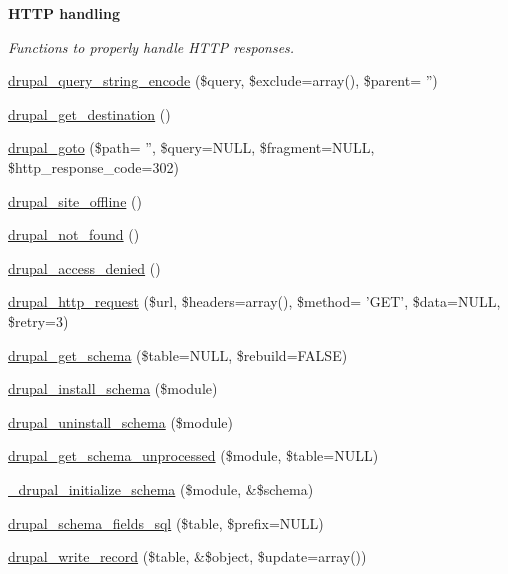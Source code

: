 \begin{Indent}{\bf HTTP handling}\par
{\em Functions to properly handle HTTP responses. }\begin{CompactItemize}
\item 
\hyperlink{common_8inc_1bd761730fc16bd2122dff2790c2842f}{drupal\_\-query\_\-string\_\-encode} (\$query, \$exclude=array(), \$parent= '')
\item 
\hyperlink{common_8inc_0c95c16e75ac4df882686daccc1f8ac5}{drupal\_\-get\_\-destination} ()
\item 
\hyperlink{common_8inc_74b81f841dbbac5a119a9cc7e3ffc614}{drupal\_\-goto} (\$path= '', \$query=NULL, \$fragment=NULL, \$http\_\-response\_\-code=302)
\item 
\hyperlink{common_8inc_fc3a1915f45be2ac8666778eef0e9758}{drupal\_\-site\_\-offline} ()
\item 
\hyperlink{common_8inc_52b08cd98e1756326c1bd5b56c39a884}{drupal\_\-not\_\-found} ()
\item 
\hyperlink{common_8inc_0bbff371f9373002e71f2e1347fcf481}{drupal\_\-access\_\-denied} ()
\item 
\hyperlink{common_8inc_7577e13ffd5887ab484be2e95aca08d9}{drupal\_\-http\_\-request} (\$url, \$headers=array(), \$method= 'GET', \$data=NULL, \$retry=3)
\end{CompactItemize}
\end{Indent}
\begin{Indent}{\bf }\par
\begin{CompactItemize}
\item 
\hyperlink{group__schemaapi_g979670bd6bd2e34337ffc5f0810f2d71}{drupal\_\-get\_\-schema} (\$table=NULL, \$rebuild=FALSE)
\item 
\hyperlink{group__schemaapi_g9706b8d6ecdac10302d83bd50935a698}{drupal\_\-install\_\-schema} (\$module)
\item 
\hyperlink{group__schemaapi_g0688b6627af9dc05f2618f81489c3db0}{drupal\_\-uninstall\_\-schema} (\$module)
\item 
\hyperlink{group__schemaapi_gecb0d63f03b96dd1426298804e091d3b}{drupal\_\-get\_\-schema\_\-unprocessed} (\$module, \$table=NULL)
\item 
\hyperlink{group__schemaapi_g7bd9447538f3e7c5baec5d8d67db164c}{\_\-drupal\_\-initialize\_\-schema} (\$module, \&\$schema)
\item 
\hyperlink{group__schemaapi_gacfcd6f676ee9062f0ba50a008a05443}{drupal\_\-schema\_\-fields\_\-sql} (\$table, \$prefix=NULL)
\item 
\hyperlink{group__schemaapi_g85da8424c4111b46aefb6fcb3a899c7d}{drupal\_\-write\_\-record} (\$table, \&\$object, \$update=array())
\end{CompactItemize}
\end{Indent}


